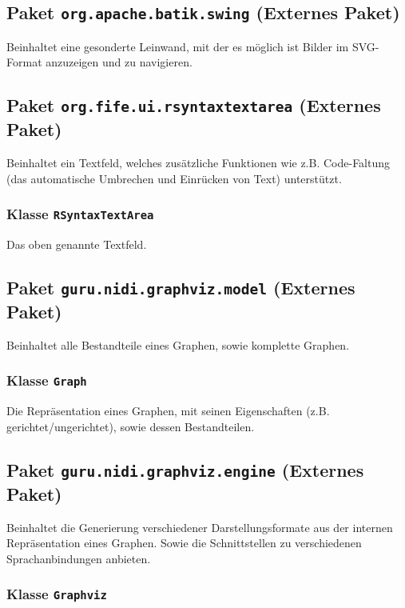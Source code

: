 \documentclass[parskip=full,11pt,twoside]{scrartcl}
\begin{document}
\subsection{Paket \texttt{org.apache.batik.swing} (Externes Paket)}

Beinhaltet eine gesonderte Leinwand, mit der es möglich ist Bilder im SVG-Format anzuzeigen und zu navigieren.

\subsection{Paket \texttt{org.fife.ui.rsyntaxtextarea} (Externes Paket)}

Beinhaltet ein Textfeld, welches zusätzliche Funktionen wie z.B. Code-Faltung (das automatische Umbrechen und Einrücken von Text) unterstützt.

\subsubsection{Klasse \texttt{RSyntaxTextArea}}

Das oben genannte Textfeld.

\subsection{Paket \texttt{guru.nidi.graphviz.model} (Externes Paket)}

Beinhaltet alle Bestandteile eines Graphen, sowie komplette Graphen.

\subsubsection{Klasse \texttt{Graph}}

Die Repräsentation eines Graphen, mit seinen Eigenschaften (z.B. gerichtet/ungerichtet), sowie dessen Bestandteilen.

\subsection{Paket \texttt{guru.nidi.graphviz.engine} (Externes Paket)}

Beinhaltet die Generierung verschiedener Darstellungsformate aus der internen Repräsentation eines Graphen. Sowie die Schnittstellen zu verschiedenen Sprachanbindungen anbieten.

\subsubsection{Klasse \texttt{Graphviz}}
\end{document}
